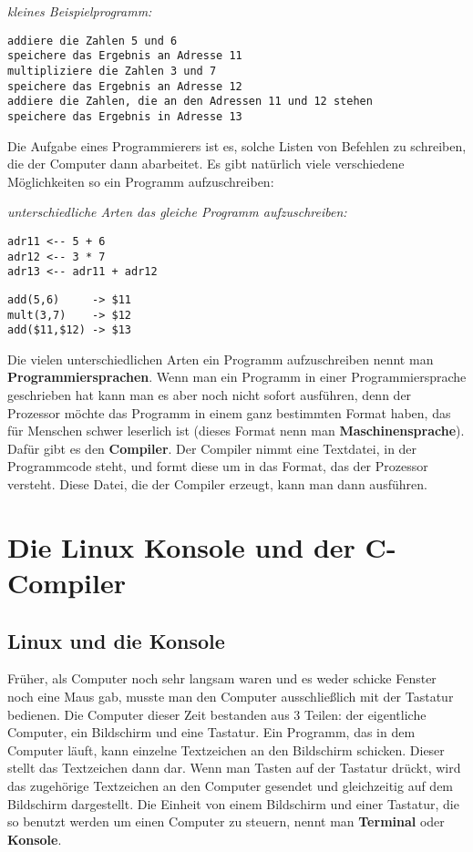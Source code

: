 \documentclass[c_worksheet.tex]{subfiles}
\begin{document}
\textit{kleines Beispielprogramm:}
\begin{lstlisting}[frame=lrtb]
addiere die Zahlen 5 und 6
speichere das Ergebnis an Adresse 11
multipliziere die Zahlen 3 und 7
speichere das Ergebnis an Adresse 12
addiere die Zahlen, die an den Adressen 11 und 12 stehen
speichere das Ergebnis in Adresse 13
\end{lstlisting}
\vspace{5pt}

Die Aufgabe eines Programmierers ist es, solche Listen von Befehlen zu schreiben, die der Computer dann abarbeitet. Es gibt natürlich viele verschiedene Möglichkeiten so ein Programm aufzuschreiben:\\
\vspace{5pt}

\textit{unterschiedliche Arten das gleiche Programm aufzuschreiben:}
\begin{multicols}{2}
\begin{lstlisting}[frame=lrtb]
adr11 <-- 5 + 6
adr12 <-- 3 * 7
adr13 <-- adr11 + adr12
\end{lstlisting}
\begin{lstlisting}[frame=lrtb]
add(5,6)     -> $11
mult(3,7)    -> $12
add($11,$12) -> $13
\end{lstlisting}
\end{multicols}
Die vielen unterschiedlichen Arten ein Programm aufzuschreiben nennt man \textbf{Programmiersprachen}. Wenn man ein Programm in einer Programmiersprache geschrieben hat kann man es aber noch nicht sofort ausführen, denn der Prozessor möchte das Programm in einem ganz bestimmten Format haben, das für Menschen schwer leserlich ist (dieses Format nenn man \textbf{Maschinensprache}). Dafür gibt es den \textbf{Compiler}. Der Compiler nimmt eine Textdatei, in der Programmcode steht, und formt diese um in das Format, das der Prozessor versteht. Diese Datei, die der Compiler erzeugt, kann man dann ausführen.

\newpage
\section{Die Linux Konsole und der C-Compiler}

\subsection{Linux und die Konsole}
Früher, als Computer noch sehr langsam waren und es weder schicke Fenster noch eine Maus gab, musste man den Computer ausschließlich mit der Tastatur bedienen.
Die Computer dieser Zeit bestanden aus 3 Teilen: der eigentliche Computer, ein Bildschirm und eine Tastatur.
Ein Programm, das in dem Computer läuft, kann einzelne Textzeichen an den Bildschirm schicken. Dieser stellt das Textzeichen dann dar.
Wenn man Tasten auf der Tastatur drückt, wird das zugehörige Textzeichen an den Computer gesendet und gleichzeitig auf dem Bildschirm dargestellt.
Die Einheit von einem Bildschirm und einer Tastatur, die so benutzt werden um einen Computer zu steuern, nennt man \textbf{Terminal} oder \textbf{Konsole}.\\
\end{document}
